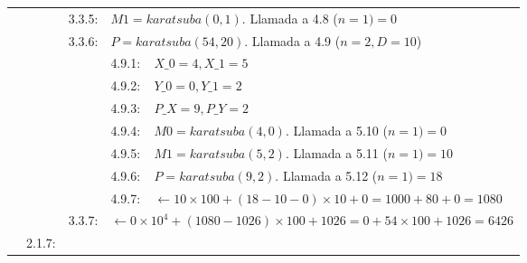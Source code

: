 \documentclass[titlepage,a4paper]{article}
\begin{document}
\begin{longtable}[r]{lllllll}
\multicolumn{3}{l}{}     & 3.3.5:     & \multicolumn{3}{l}{$M1=karatsuba(0,1)$. Llamada a 4.8 ($n=1) = \boxed{0}$}     \\
\multicolumn{3}{l}{}     & 3.3.6:     & \multicolumn{3}{l}{$P=karatsuba(54,20)$. Llamada a 4.9 ($n=2,D=10$)}     \\
\multicolumn{4}{l}{}     & 4.9.1:     & \multicolumn{2}{l}{$X\_0=4, X\_1=5$}     \\
\multicolumn{4}{l}{}     & 4.9.2:     & \multicolumn{2}{l}{$Y\_0=0, Y\_1=2$}     \\
\multicolumn{4}{l}{}     & 4.9.3:     & \multicolumn{2}{l}{$P\_X=9, P\_Y=2$}     \\
\multicolumn{4}{l}{}     & 4.9.4:     & \multicolumn{2}{l}{$M0=karatsuba(4,0)$. Llamada a 5.10 ($n=1) = \boxed{0}$}     \\
\multicolumn{4}{l}{}     & 4.9.5:     & \multicolumn{2}{l}{$M1=karatsuba(5,2)$. Llamada a 5.11 ($n=1) = \boxed{10}$}     \\
\multicolumn{4}{l}{}     & 4.9.6:     & \multicolumn{2}{l}{$P=karatsuba(9,2)$. Llamada a 5.12 ($n=1) = \boxed{18}$}     \\
\multicolumn{4}{l}{}     & 4.9.7:     & \multicolumn{2}{l}{$\leftarrow 10\times 100 + (18-10-0)\times 10 + 0 =  1000 + 80 + 0 = \boxed{1080}$}     \\
\multicolumn{3}{l}{}     & 3.3.7:     & \multicolumn{3}{l}{$\leftarrow 0\times 10^4 + (1080-1026)\times 100 + 1026 =  0 + 54\times 100 + 1026 = \boxed{6426}$}     \\
\multicolumn{2}{l}{}     & 2.1.7:     & \multicolumn{4}{l}{

}
\end{longtable}
\end{document}
